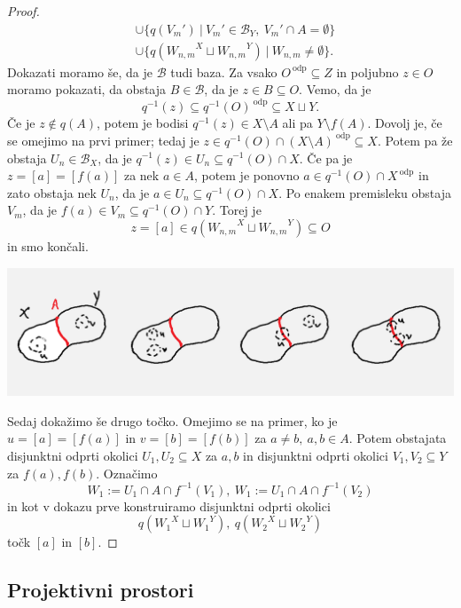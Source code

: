 \documentclass[10pt, a4paper]{article}
\newenvironment{noticeC}{%
  \tcolorbox[%
  notitle,
  empty,
  enhanced,  %
  breakable,
  coltext=black, 
  fontupper=\rmfamily,
  noparskip,
  sharp corners,
  boxrule=-1pt,  %
  frame hidden,
  left=7pt,  %
  right=7pt,
  top=5pt,
  bottom=5pt,
  before skip=2.5ex plus 2pt,
  after skip=2.5ex plus 2pt,
  overlay unbroken and last={%
  },
  ]}
{\endtcolorbox}
\newenvironment{dokaz}%
  {\begin{noticeC}\begin{proof}}%
  {\end{proof}\end{noticeC}}
\begin{document}
\begin{dokaz}
\begin{align*}
    &\cup \{q(V_m')\ |\ V_m' \in \mathcal{B}_Y,\ V_m' \cap A = \emptyset\}\\
    &\cup \{q({W_{n, m} }^{X} \sqcup {W_{n, m} }^{Y})\ |\ W_{n, m} \neq \emptyset\}.
  \end{align*}
  Dokazati moramo še, da je $\mathcal{B}$ tudi baza.
  Za vsako $O^{\ \text{odp}} \subseteq Z$ in poljubno $z \in O$ moramo 
  pokazati, da obstaja $B \in \mathcal{B}$, da je $z \in B \subseteq O$.
  Vemo, da je $$q^{-1} (z) \subseteq q^{-1} (O)^{\ \text{odp}} \subseteq X \sqcup Y.$$
  Če je $z \notin q(A)$, potem je bodisi $q^{-1} (z) \in X \setminus A$ ali pa $Y \setminus f(A)$.
  Dovolj je, če se omejimo na prvi primer; tedaj je $z \in q^{-1} (O) \cap (X \setminus A)^{\ \text{odp}} \subseteq X$.
  Potem pa že obstaja $U_n \in \mathcal{B}_X$, da je $q^{-1}(z) \in U_n \subseteq q^{-1} (O) \cap X$.
  Če pa je $z = [a] = [f(a)]$ za nek $a \in A$, potem je ponovno 
  $a \in q^{-1} (O) \cap X^{\ \text{odp}}$ in zato obstaja nek $U_n$,
  da je $a \in U_n \subseteq q^{-1} (O) \cap X$. Po enakem premisleku obstaja $V_m$,
  da je $f(a) \in V_m \subseteq q^{-1} (O) \cap Y$.
  Torej je $$z = [a] \in q({W_{n, m} }^X \sqcup {W_{n, m} }^Y) \subseteq O$$
  in smo končali.
  \begin{center}
    \includegraphics[scale=0.75]{dokaz2.png}
  \end{center}
  Sedaj dokažimo še drugo točko. Omejimo se na primer, ko je 
  $u = [a] = [f(a)]$ in $v = [b] = [f(b)]$ za $a \neq b,\ a, b \in A$.
  Potem obstajata disjunktni odprti okolici $U_1, U_2 \subseteq X$ za $a, b$
  in disjunktni odprti okolici $V_1, V_2 \subseteq Y$ za $f(a), f(b)$.
  Označimo 
  $$W_1 := U_1 \cap A \cap f^{-1} (V_1),\ W_1 := U_1 \cap A \cap f^{-1} (V_2)$$
  in kot v dokazu prve konstruiramo disjunktni odprti okolici 
  $$q({W_1 }^{X} \sqcup {W_1 }^{Y}),\ q({W_2 }^{X} \sqcup {W_2 }^{Y})$$
  točk $[a]$ in $[b]$.
\end{dokaz}

\subsection{Projektivni prostori}
\end{document}

